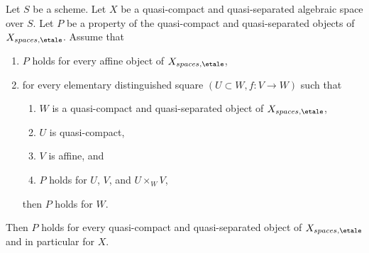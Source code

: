 \begin{lemma}
\label{lemma-induction-principle}
Let $S$ be a scheme. Let $X$ be a quasi-compact and quasi-separated
algebraic space over $S$. Let $P$ be a property of the quasi-compact
and quasi-separated objects of $X_{spaces, \etale}$. Assume that
\begin{enumerate}
\item $P$ holds for every affine object of $X_{spaces, \etale}$,
\item for every elementary distinguished square $(U \subset W, f : V \to W)$
such that
\begin{enumerate}
\item $W$ is a quasi-compact and quasi-separated object of
$X_{spaces, \etale}$,
\item $U$ is quasi-compact,
\item $V$ is affine, and
\item $P$ holds for $U$, $V$, and $U \times_W V$,
\end{enumerate}
then $P$ holds for $W$.
\end{enumerate}
Then $P$ holds for every quasi-compact and quasi-separated object
of $X_{spaces, \etale}$ and in particular for $X$.
\end{lemma}

